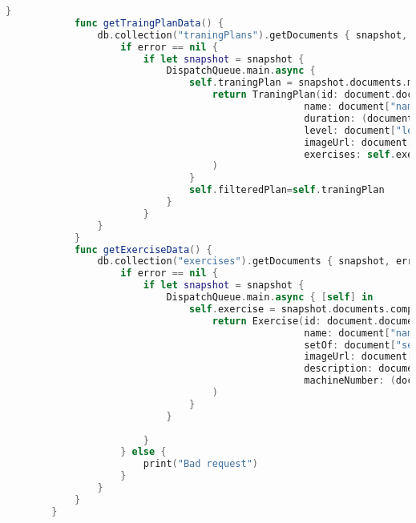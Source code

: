 \begin{minipage}{\textwidth}
\begin{lstlisting}[language=swift]
            }
            func getTraingPlanData() {
                db.collection("traningPlans").getDocuments { snapshot, error in
                    if error == nil {
                        if let snapshot = snapshot {
                            DispatchQueue.main.async {
                                self.traningPlan = snapshot.documents.map { document in
                                    return TraningPlan(id: document.documentID,
                                                    name: document["name"] as? String ?? "",
                                                    duration: (document["duration"] as? Int ?? nil)!,
                                                    level: document["level"] as? String ?? "",
                                                    imageUrl: document["imageUrl"] as? String ?? "",
                                                    exercises: self.exercise
                                    )
                                }
                                self.filteredPlan=self.traningPlan
                            }
                        }
                }
            }
            func getExerciseData() {
                db.collection("exercises").getDocuments { snapshot, error in
                    if error == nil {
                        if let snapshot = snapshot {
                            DispatchQueue.main.async { [self] in
                                self.exercise = snapshot.documents.compactMap { document in
                                    return Exercise(id: document.documentID,
                                                    name: document["name"] as? String ?? "",
                                                    setOf: document["setOf"] as? String ?? "",
                                                    imageUrl: document["imageUrl"] as? String ?? "",
                                                    description: document["description"] as? String ?? "",
                                                    machineNumber: (document["machineNumber"] as? Int ?? nil)!
                                    )
                                }
                            }
                            
                        }
                    } else {
                        print("Bad request")
                    }
                }
            }
        }
    
    \end{lstlisting}   
\end{minipage}

